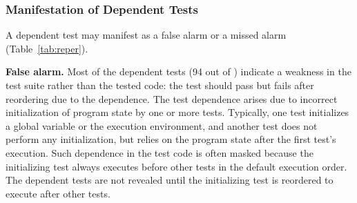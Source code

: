 


\subsubsection{Manifestation of Dependent Tests}
\label{sec:repercussion}



A dependent test may manifest as a false alarm or a missed alarm
(Table~\ref{tab:reper}).

\vspace{1mm}

\noindent \textbf{False alarm.} Most of
the dependent tests (94 out of \dtnum) indicate a weakness in the test suite rather than the
tested code:  
the test should pass but fails after reordering due to the dependence.
The test dependence arises due to incorrect initialization
of program state by one
or more tests. Typically, one test initializes
a global variable or the execution environment, and another
test does not perform any initialization, but
relies on the program state after the first test's execution.
Such dependence in the test code is often masked because
the initializing test always executes before other tests in the
default execution order. The dependent tests are not revealed
until the initializing test is reordered to execute
after other tests. 


